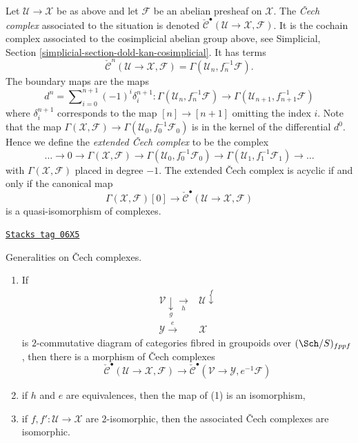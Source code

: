 \medskip\noindent
Let $\mathcal{U} \to \mathcal{X}$ be as above and let $\mathcal{F}$
be an abelian presheaf on $\mathcal{X}$.
The {\it {\v C}ech complex} associated to the situation is denoted
$\check{\mathcal{C}}^\bullet(\mathcal{U} \to \mathcal{X}, \mathcal{F})$.
It is the cochain complex associated to the cosimplicial abelian group
above, see
Simplicial, Section \ref{simplicial-section-dold-kan-cosimplicial}.
It has terms
$$
\check{\mathcal{C}}^n(\mathcal{U} \to \mathcal{X}, \mathcal{F})
= \Gamma(\mathcal{U}_n, f_n^{-1}\mathcal{F}).
$$
The boundary maps are the maps
$$
d^n = \sum\nolimits_{i = 0}^{n + 1} (-1)^i \delta^{n + 1}_i :
\Gamma(\mathcal{U}_n, f_n^{-1}\mathcal{F})
\longrightarrow
\Gamma(\mathcal{U}_{n + 1}, f_{n + 1}^{-1}\mathcal{F})
$$
where $\delta^{n + 1}_i$ corresponds to the map
$[n] \to [n + 1]$ omitting the index $i$. Note that the map
$\Gamma(\mathcal{X}, \mathcal{F}) \to
\Gamma(\mathcal{U}_0, f_0^{-1}\mathcal{F}_0)$
is in the kernel of the differential $d^0$. Hence we define
the {\it extended {\v C}ech complex} to be the complex
$$
\ldots \to 0 \to
\Gamma(\mathcal{X}, \mathcal{F}) \to
\Gamma(\mathcal{U}_0, f_0^{-1}\mathcal{F}_0) \to
\Gamma(\mathcal{U}_1, f_1^{-1}\mathcal{F}_1) \to \ldots
$$
with $\Gamma(\mathcal{X}, \mathcal{F})$ placed in degree $-1$.
The extended {\v C}ech complex is acyclic if and only if the canonical map
$$
\Gamma(\mathcal{X}, \mathcal{F})[0]
\longrightarrow
\check{\mathcal{C}}^\bullet(\mathcal{U} \to \mathcal{X}, \mathcal{F})
$$
is a quasi-isomorphism of complexes.

\begin{lemma}[Generalities]
\label{stacks-sheaves-lemma-generalities}
\href{https://stacks.math.columbia.edu/tag/06X5}{\texttt{Stacks tag 06X5}}

Generalities on {\v C}ech complexes.
\begin{enumerate}
\item If
$$
\begin{array}{cc}\mathcal{V} \underset{g}{\downarrow}\underset{h}{\longrightarrow} & \mathcal{U} \overset{f}{\downarrow} \\ \mathcal{Y} \overset{e}{\longrightarrow} & \mathcal{X}\end{array}
$$
is $2$-commutative diagram of categories fibred in groupoids over
$(\Sch/S)_{fppf}$, then there is a morphism of {\v C}ech complexes
$$
\check{\mathcal{C}}^\bullet(\mathcal{U} \to \mathcal{X}, \mathcal{F})
\longrightarrow
\check{\mathcal{C}}^\bullet(\mathcal{V} \to \mathcal{Y}, e^{-1}\mathcal{F})
$$
\item if $h$ and $e$ are equivalences, then the map of (1) is an isomorphism,
\item if $f, f' : \mathcal{U} \to \mathcal{X}$ are $2$-isomorphic, then
the associated {\v C}ech complexes are isomorphic.
\end{enumerate}
\end{lemma}


